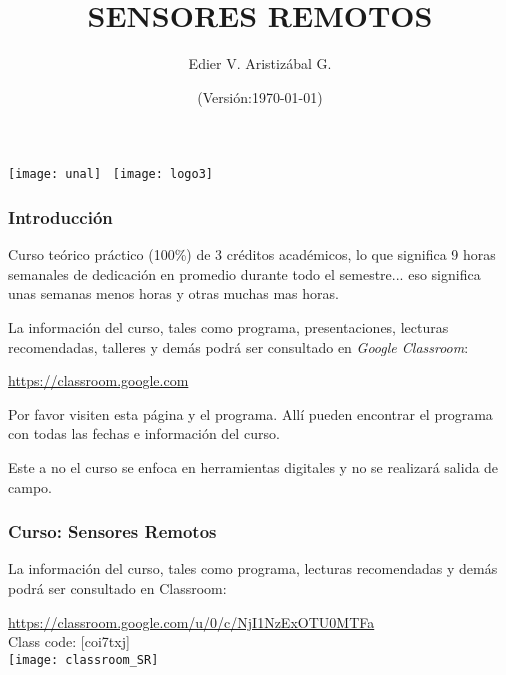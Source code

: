 \documentclass[]{beamer}
\title[Introducción]{SENSORES REMOTOS}
\author[Edier Aristizábal]{Edier V. Aristizábal G.}
\institute{\emph{evaristizabalg@unal.edu.co}}
\date{(Versión:\today)}
\begin{document}
\begin{frame}
\titlepage
\centering
	\texttt{[image: unal]}\hspace*{4.75cm}~%
   	\texttt{[image: logo3]} 
\end{frame}
\begin{frame}
\frametitle{Introducción}
\justifying
\small{Curso teórico práctico (100\%) de 3 créditos académicos, lo que significa 9 horas semanales de dedicación en promedio durante todo el semestre... eso significa unas semanas menos horas y otras muchas mas horas.\vfill
\par La información del curso, tales como programa, presentaciones, lecturas recomendadas, talleres y demás podrá ser consultado en \emph{Google Classroom}:\vfill

\url{https://classroom.google.com}\vfill


\par Por favor visiten esta página y el programa. Allí pueden encontrar el programa con todas las fechas e información del curso.\vfill

\par Este  a no  el  curso  se  enfoca  en  herramientas  digitales  y  no  se  realizará  salida  de campo.
}
\end{frame}
\begin{frame}
\frametitle{Curso: Sensores Remotos}
\justifying
\small{
La información del curso, tales como programa, lecturas recomendadas y demás podrá ser consultado en Classroom:\vfill
\begin{center}
\url{https://classroom.google.com/u/0/c/NjI1NzExOTU0MTFa}\\
Class code: [coi7txj]\\
\texttt{[image: classroom\_SR]}
\end{center}}
\end{frame}
\end{document}
